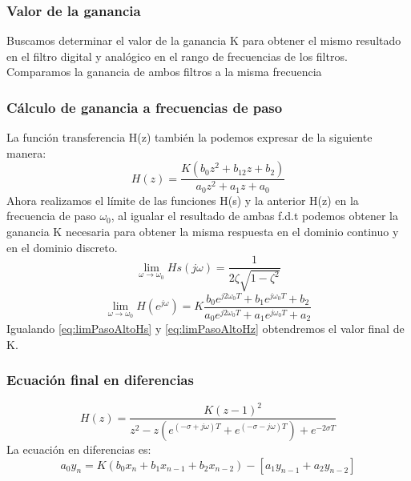 \documentclass[titlepage]{article}
\begin{document}
\subsubsection{Valor de la ganancia}
Buscamos determinar el valor de la ganancia K para obtener el mismo resultado en el filtro digital y analógico en el rango de frecuencias de los filtros. Comparamos la ganancia de ambos filtros a la misma frecuencia 
\subsubsection{Cálculo de ganancia a frecuencias de paso}
La función transferencia H(z) también la podemos expresar de la siguiente manera:
\begin{equation}
H(z)=\frac{K(b_0z^2+b_12z+b_2)}{a_0z^2+a_1z+a_0}
\end{equation}
Ahora realizamos el límite de las funciones H(s) y la anterior H(z) en la frecuencia de paso $\omega_0$, al igualar el resultado de ambas f.d.t podemos obtener la ganancia K necesaria para obtener la misma respuesta en el dominio continuo y en el dominio discreto.
\begin{equation}
\label{eq:limPasoAltoHs}\lim_{\omega \to \omega_0}Hs(j\omega)=\frac{1}{2\zeta\sqrt{1-\zeta^2}}
\end{equation}
\begin{equation}
\label{eq:limPasoAltoHz}\lim_{\omega \to \omega_0}H(e^{j\omega})=K\frac{b_0e^{j2\omega_0T}+b_1e^{j\omega_0T}+b_2}{a_0e^{j2\omega_0T}+a_1e^{j\omega_0T}+a_2}
\end{equation}
Igualando \ref{eq:limPasoAltoHs} y \ref{eq:limPasoAltoHz} obtendremos el valor final de K.
\subsubsection{Ecuación final en diferencias}
\begin{equation}
H(z)=\frac{K(z-1)^2}{z^2-z(e^{(-\sigma+j\omega)T}+e^{(-\sigma-j\omega)T}) + e^{-2{\sigma}T}}
\end{equation}
La ecuación en diferencias es:
\begin{equation}
a_0y_n=K(b_0x_{n}+b_1x_{n-1}+b_2x_{n-2})-[a_1y_{n-1} + a_2y_{n-2}]
\end{equation}
\end{document}
